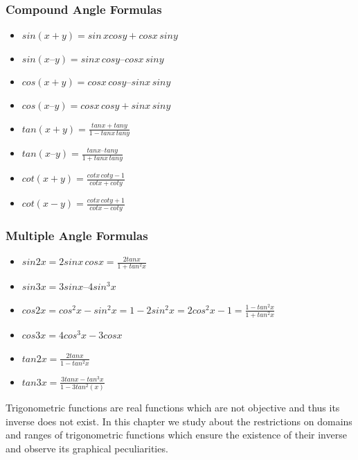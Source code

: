 \documentclass[12pt]{article}
\begin{document}
\begin{multicols}{2}
              \subsubsection*{Compound Angle Formulas}
              \begin{itemize}
                  \item $sin(x + y) = sin\, x cos y + cos x \,sin y$
              
              \item $sin(x – y) = sin x \,cos y – cos x\, sin y$
              
              \item $cos(x + y) = cos x\, cos y – sin x \,sin y$
              
              \item $cos(x – y) = cos x\, cos y + sin x\, sin y$
              
              \item  $tan ( x + y) =\frac{tan x + tan y}{1 - tan x\, tan y}$
              \item $tan ( x – y) =\frac{tan x – tan y}{1 + tan x\, tan y}$
              \item $cot(x+y)=\frac{cotx \,coty-1}{cot x+cot y}$
              \item  $cot(x-y)=\frac{cotx \,coty+1}{cot x-cot y}$
              
              \end{itemize}
              
              \subsubsection*{ Multiple Angle Formulas}
              \begin{itemize}
                  \item $sin 2x=2 sinx \, cosx=\frac{2tanx}{1+ tan^2 x}$
                  \item $sin 3x = 3 sin x – 4 sin^3 x$
                  \item $cos 2x =cos^2 x - sin^2 x =1- 2sin^2x=2cos^2x-1=\frac{1-tan^2 x}{1+ tan^2 x}$
                  \item  $cos 3x=4 cos^3 x -3 cos x$
                  \item $tan 2x =\frac{2 tan x }{1- tan^2x}$
                  \item $tan 3x=\frac{3 tan x -tan^{3}x}{1-3tan^2(x)}$
                  
              \end{itemize}
    Trigonometric functions are real functions which are not objective and thus its inverse does not exist. In this chapter we study about the restrictions on domains and ranges of trigonometric functions which ensure the existence of their inverse and observe its graphical peculiarities.


\end{multicols}
\end{document}
